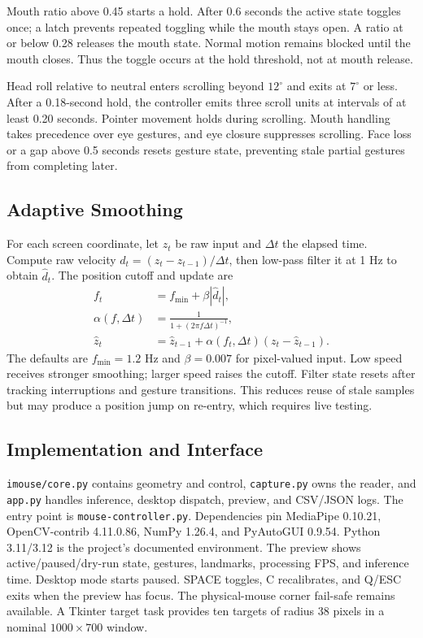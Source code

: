 \documentclass[10pt,twocolumn,letterpaper]{article}
\begin{document}
Mouth ratio above 0.45 starts a hold. After 0.6 seconds the active state toggles once; a latch prevents repeated toggling while the mouth stays open. A ratio at or below 0.28 releases the mouth state. Normal motion remains blocked until the mouth closes. Thus the toggle occurs at the hold threshold, not at mouth release.

Head roll relative to neutral enters scrolling beyond $12^\circ$ and exits at $7^\circ$ or less. After a 0.18-second hold, the controller emits three scroll units at intervals of at least 0.20 seconds. Pointer movement holds during scrolling. Mouth handling takes precedence over eye gestures, and eye closure suppresses scrolling. Face loss or a gap above 0.5 seconds resets gesture state, preventing stale partial gestures from completing later.

\subsection{Adaptive Smoothing}
For each screen coordinate, let $z_t$ be raw input and $\Delta t$ the elapsed time. Compute raw velocity $d_t=(z_t-z_{t-1})/\Delta t$, then low-pass filter it at 1 Hz to obtain $\widehat d_t$. The position cutoff and update are
\begin{align}
f_t&=f_{\min}+\beta|\widehat d_t|,\\
\alpha(f,\Delta t)&=\frac{1}{1+(2\pi f\Delta t)^{-1}},\\
\widehat z_t&=\widehat z_{t-1}+\alpha(f_t,\Delta t)(z_t-\widehat z_{t-1}).
\end{align}
The defaults are $f_{\min}=1.2$ Hz and $\beta=0.007$ for pixel-valued input. Low speed receives stronger smoothing; larger speed raises the cutoff. Filter state resets after tracking interruptions and gesture transitions. This reduces reuse of stale samples but may produce a position jump on re-entry, which requires live testing.

\subsection{Implementation and Interface}
\texttt{imouse/core.py} contains geometry and control, \texttt{capture.py} owns the reader, and \texttt{app.py} handles inference, desktop dispatch, preview, and CSV/JSON logs. The entry point is \texttt{mouse-controller.py}. Dependencies pin MediaPipe 0.10.21, OpenCV-contrib 4.11.0.86, NumPy 1.26.4, and PyAutoGUI 0.9.54. Python 3.11/3.12 is the project's documented environment. The preview shows active/paused/dry-run state, gestures, landmarks, processing FPS, and inference time. Desktop mode starts paused. SPACE toggles, C recalibrates, and Q/ESC exits when the preview has focus. The physical-mouse corner fail-safe remains available. A Tkinter target task provides ten targets of radius 38 pixels in a nominal $1000\times700$ window.
\end{document}
